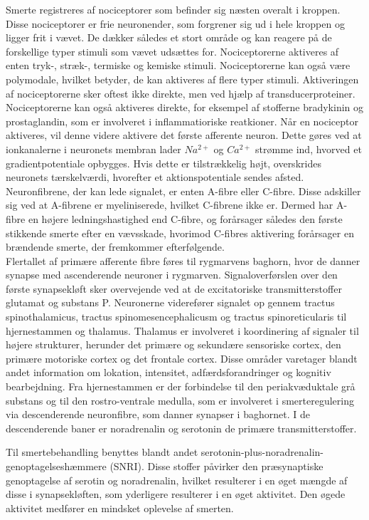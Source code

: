 Smerte registreres af nociceptorer som befinder sig næsten overalt i kroppen. Disse nociceptorer er frie neuronender, som forgrener sig ud i hele kroppen og ligger frit i vævet. De dækker således et stort område og kan reagere på de forskellige typer stimuli som vævet udsættes for. Nociceptorerne aktiveres af enten tryk-, stræk-, termiske og kemiske stimuli. Nociceptorerne kan også være polymodale, hvilket betyder, de kan aktiveres af flere typer stimuli. Aktiveringen af nociceptorerne sker oftest ikke direkte, men ved hjælp af transducerproteiner. Nociceptorerne kan  også aktiveres direkte, for eksempel af stofferne bradykinin og prostaglandin, som er involveret i inflammatioriske reatkioner. \citep{smerter}
Når en nociceptor aktiveres, vil denne videre aktivere det første afferente neuron. Dette gøres ved at ionkanalerne i neuronets membran lader $Na^{2+}$ og $Ca^{2+}$ strømme ind, hvorved et gradientpotentiale opbygges. Hvis dette er tilstrækkelig højt, overskrides neuronets tærskelværdi, hvorefter et aktionspotentiale sendes afsted. Neuronfibrene, der kan lede signalet, er enten A-fibre eller C-fibre. Disse adskiller sig ved at A-fibrene er myeliniserede, hvilket C-fibrene ikke er. Dermed har A-fibre en højere ledningshastighed end C-fibre, og forårsager således den første stikkende smerte efter en vævsskade, hvorimod C-fibres aktivering forårsager en brændende smerte, der fremkommer efterfølgende. \citep{smerter} \\
Flertallet af primære afferente fibre føres til rygmarvens baghorn, hvor de danner synapse med ascenderende neuroner i rygmarven. Signaloverførslen over den første synapsekløft sker overvejende ved at de excitatoriske transmitterstoffer glutamat og substans P. 
Neuronerne viderefører signalet op gennem tractus spinothalamicus, tractus spinomesencephalicusm og tractus spinoreticularis til hjernestammen og thalamus. Thalamus er involveret i koordinering af signaler til højere strukturer, herunder det primære og sekundære sensoriske cortex, den primære motoriske cortex og det frontale cortex. Disse områder varetager blandt andet information om lokation, intensitet, adfærdsforandringer og kognitiv bearbejdning. 
Fra hjernestammen er der forbindelse til den periakvæduktale grå substans og til den rostro-ventrale medulla, som er involveret i smerteregulering via descenderende neuronfibre, som danner synapser i baghornet. I de descenderende baner er noradrenalin og serotonin de primære transmitterstoffer. \citep{smerter}

Til smertebehandling benyttes blandt andet serotonin-plus-noradrenalin-genoptagelseshæmmere (SNRI). Disse stoffer påvirker den præsynaptiske genoptagelse af serotin og noradrenalin, hvilket resulterer i en øget mængde af disse i synapsekløften, som yderligere resulterer i en øget aktivitet. Den øgede aktivitet medfører en mindsket oplevelse af smerten. \citep{smerter}

